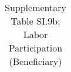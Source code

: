 \begin{longtable}{llcccccccccc}
\caption{Supplementary Table SI.9b: Labor Participation (Beneficiary)} \label{tab:pap__d3_daysb} \\                                                                                                                                                                                                                                                                                                                                                                                                                                                                                                                                                                                                                                                                                                                                                                                       
\hline \hline                                                                                                                                                                                                                                                                                                                                                                                                                                                                                                                                                                                                                                                                                                                                                                                                                                                                             

\end{longtable}
